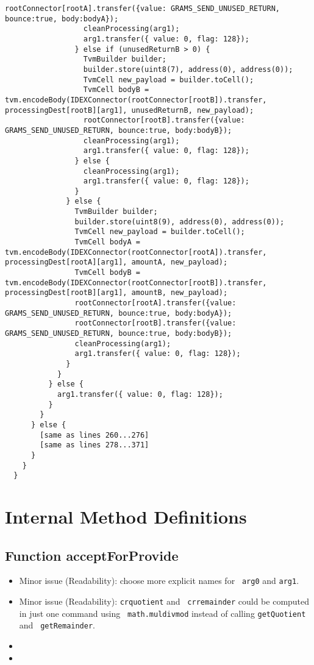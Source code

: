 \begin{lstlisting}[firstnumber=248]
                  rootConnector[rootA].transfer({value: GRAMS_SEND_UNUSED_RETURN, bounce:true, body:bodyA});
                  cleanProcessing(arg1);
                  arg1.transfer({ value: 0, flag: 128});
                } else if (unusedReturnB > 0) {
                  TvmBuilder builder;
                  builder.store(uint8(7), address(0), address(0));
                  TvmCell new_payload = builder.toCell();
                  TvmCell bodyB = tvm.encodeBody(IDEXConnector(rootConnector[rootB]).transfer, processingDest[rootB][arg1], unusedReturnB, new_payload);
                  rootConnector[rootB].transfer({value: GRAMS_SEND_UNUSED_RETURN, bounce:true, body:bodyB});
                  cleanProcessing(arg1);
                  arg1.transfer({ value: 0, flag: 128});
                } else {
                  cleanProcessing(arg1);
                  arg1.transfer({ value: 0, flag: 128});
                }
              } else {
                TvmBuilder builder;
                builder.store(uint8(9), address(0), address(0));
                TvmCell new_payload = builder.toCell();
                TvmCell bodyA = tvm.encodeBody(IDEXConnector(rootConnector[rootA]).transfer, processingDest[rootA][arg1], amountA, new_payload);
                TvmCell bodyB = tvm.encodeBody(IDEXConnector(rootConnector[rootB]).transfer, processingDest[rootB][arg1], amountB, new_payload);
                rootConnector[rootA].transfer({value: GRAMS_SEND_UNUSED_RETURN, bounce:true, body:bodyA});
                rootConnector[rootB].transfer({value: GRAMS_SEND_UNUSED_RETURN, bounce:true, body:bodyB});
                cleanProcessing(arg1);
                arg1.transfer({ value: 0, flag: 128});
              }
            }
          } else {
            arg1.transfer({ value: 0, flag: 128});
          }
        }
      } else {
        [same as lines 260...276]
        [same as lines 278...371]
      }
    }
  }
\end{lstlisting}

\section{Internal Method Definitions}

\subsection{Function acceptForProvide}

\begin{itemize}
\item Minor issue (Readability): choose more explicit names for {\tt
  arg0} and {\tt arg1}.
\item Minor issue (Readability): {\tt crquotient} and {\tt
  crremainder} could be computed in just one command using {\tt
  math.muldivmod} instead of calling {\tt getQuotient} and {\tt
  getRemainder}.
\item \issueError{}
\item \issueInternal
\end{itemize}

